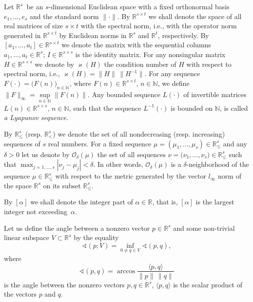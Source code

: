 \documentclass[11pt]{article}
\begin{document}
Let $\mathbb{R}^{s}$~be an $s$-dimensional Euclidean space with a fixed
orthonormal basis $e_{1},\ldots ,e_{s}$ and the standard norm $\| \cdot
\| $. By $\mathbb{R}^{s\times t}$ we shall denote the space of all real
matrices of  size $s\times t$ with the spectral norm, i.e., with the
operator norm generated in $\mathbb{R}^{s\times t}$ by Euclidean norms in $%
\mathbb{R}^{s}$ and $\mathbb{R}^{t}$, respectively. By $[ a_{1},\ldots
,a_{t}] \in \mathbb{R}^{s\times t}$ we denote the matrix with the
sequential columns $a_{1},\ldots ,a_{t}\in \mathbb{R}^{s}$; $I\in \mathbb{R}%
^{s\times s}$ is the identity matrix. For any nonsingular matrix $H\in 
\mathbb{R}^{s\times s}$  we denote by $\varkappa (H)$ the condition number of 
$H$ with respect to spectral norm, i.\thinspace e., $\varkappa (H)=\|
H\| \,\| H^{-1}\| $. For any sequence $F(\cdot )=\bigl(F(n)\bigr)%
_{n\in \mathbb{N}}$, where $F(n)\in \mathbb{R}^{s\times t}$, $n\in \mathbb{N}
$, we define $\| F\| _{\infty }=\sup\limits_{n\in \mathbb{N}}\|
F(n)\| $. Any bounded sequence $L(\cdot )$ of invertible matrices $%
L(n)\in \mathbb{R}^{s\times s}$, $n\in\mathbb{N}$, such that the sequence $%
L^{-1}(\cdot )$ is bounded on $\mathbb{N}$, is called 
\emph{a Lyapunov sequence}.

By $\mathbb{R}_{\le }^{s}$ (resp. $\mathbb{R}_{<}^{s}$) we denote the set of all
nondecreasing (resp. increasing) sequences of $s$ real numbers. For a fixed
sequence $\mu =(\mu _{1},\dots ,\mu _{s})\in \mathbb{R}_{\le }^{s}$ and any 
$\delta >0$ let us denote by $\mathcal{O}_{\delta }(\mu )$ the set of all
sequences $\nu =\bigl(\nu _{1},\dots ,\nu _{s}\bigr)\in \mathbb{R}_{\le
}^{s}$ such that $\max_{j=1,\ldots ,s}|\nu _{j}-\mu _{j}|<\delta $. In other
words, $\mathcal{O}_{\delta }(\mu )$ is a $\delta $-neighborhood of the
sequence $\mu \in \mathbb{R}_{\le }^{s}$ with respect to the metric
generated by the vector $l_{\infty }$ norm of the space $\mathbb{R}^{s}$ on
its subset $\mathbb{R}_{\le }^{s}$.

By $[\alpha ]$ we shall denote the integer part of $\alpha \in \mathbb{R}$,
that is, $[\alpha ]$ is the largest integer not exceeding~$\alpha $.

Let us define the angle between a nonzero vector $p\in \mathbb{R}^{s}$ and
some non-trivial linear subspace $V\subset \mathbb{R}^{s}$ by the 
equality%
\begin{equation*}
\sphericalangle (p;V)=\inf\limits_{0\neq q\in V}\sphericalangle (p,q),
\end{equation*}%
where 
\begin{equation*}
\sphericalangle (p,q)=\arccos \frac{\langle p,q\rangle }{\| p\|
\,\| q\| }
\end{equation*}%
is the angle between the nonzero vectors $p,q\in \mathbb{R}^{s}$, $\langle
p,q\rangle $ is the scalar product of the vectors $p$ and $q$.
\end{document}
